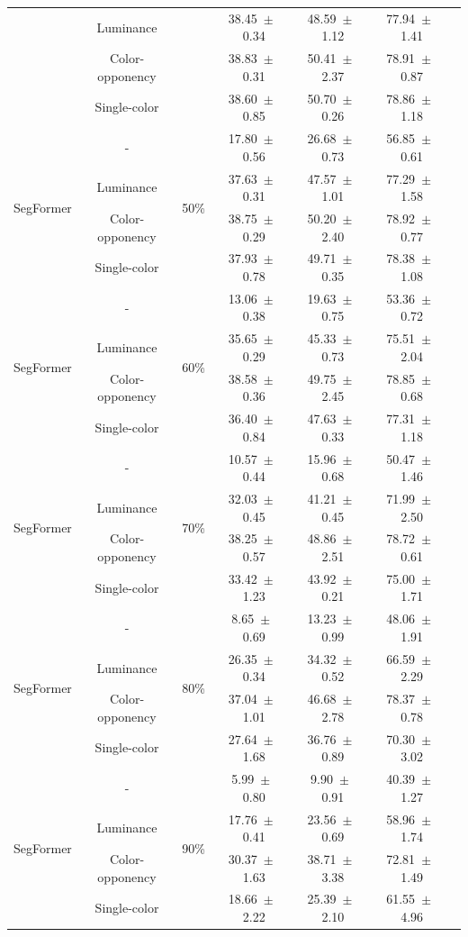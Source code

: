 \begin{table}[h]
\begin{tabular}{@{}lccc ccc@{}}
& Luminance & & 38.45~$\pm$~0.34 & 48.59~$\pm$~1.12 & 77.94~$\pm$~1.41 \\
& Color-opponency & & 38.83~$\pm$~0.31 & 50.41~$\pm$~2.37 & 78.91~$\pm$~0.87 \\
& Single-color & & 38.60~$\pm$~0.85 & 50.70~$\pm$~0.26 & 78.86~$\pm$~1.18 \\
\midrule
\multirow{4}{*}{SegFormer} & - & \multirow{4}{*}{50\%} & 17.80~$\pm$~0.56 & 26.68~$\pm$~0.73 & 56.85~$\pm$~0.61 \\
& Luminance & & 37.63~$\pm$~0.31 & 47.57~$\pm$~1.01 & 77.29~$\pm$~1.58 \\
& Color-opponency & & 38.75~$\pm$~0.29 & 50.20~$\pm$~2.40 & 78.92~$\pm$~0.77 \\
& Single-color & & 37.93~$\pm$~0.78 & 49.71~$\pm$~0.35 & 78.38~$\pm$~1.08 \\
\midrule
\multirow{4}{*}{SegFormer} & - & \multirow{4}{*}{60\%} & 13.06~$\pm$~0.38 & 19.63~$\pm$~0.75 & 53.36~$\pm$~0.72 \\
& Luminance & & 35.65~$\pm$~0.29 & 45.33~$\pm$~0.73 & 75.51~$\pm$~2.04 \\
& Color-opponency & & 38.58~$\pm$~0.36 & 49.75~$\pm$~2.45 & 78.85~$\pm$~0.68 \\
& Single-color & & 36.40~$\pm$~0.84 & 47.63~$\pm$~0.33 & 77.31~$\pm$~1.18 \\
\midrule
\multirow{4}{*}{SegFormer} & - & \multirow{4}{*}{70\%} & 10.57~$\pm$~0.44 & 15.96~$\pm$~0.68 & 50.47~$\pm$~1.46 \\
& Luminance & & 32.03~$\pm$~0.45 & 41.21~$\pm$~0.45 & 71.99~$\pm$~2.50 \\
& Color-opponency & & 38.25~$\pm$~0.57 & 48.86~$\pm$~2.51 & 78.72~$\pm$~0.61 \\
& Single-color & & 33.42~$\pm$~1.23 & 43.92~$\pm$~0.21 & 75.00~$\pm$~1.71 \\
\midrule
\multirow{4}{*}{SegFormer} & - & \multirow{4}{*}{80\%} & 8.65~$\pm$~0.69 & 13.23~$\pm$~0.99 & 48.06~$\pm$~1.91 \\
& Luminance & & 26.35~$\pm$~0.34 & 34.32~$\pm$~0.52 & 66.59~$\pm$~2.29 \\
& Color-opponency & & 37.04~$\pm$~1.01 & 46.68~$\pm$~2.78 & 78.37~$\pm$~0.78 \\
& Single-color & & 27.64~$\pm$~1.68 & 36.76~$\pm$~0.89 & 70.30~$\pm$~3.02 \\
\midrule
\multirow{4}{*}{SegFormer} & - & \multirow{4}{*}{90\%} & 5.99~$\pm$~0.80 & 9.90~$\pm$~0.91 & 40.39~$\pm$~1.27 \\
& Luminance & & 17.76~$\pm$~0.41 & 23.56~$\pm$~0.69 & 58.96~$\pm$~1.74 \\
& Color-opponency & & 30.37~$\pm$~1.63 & 38.71~$\pm$~3.38 & 72.81~$\pm$~1.49 \\
& Single-color & & 18.66~$\pm$~2.22 & 25.39~$\pm$~2.10 & 61.55~$\pm$~4.96 \\
\midrule
\bottomrule
\end{tabular}
\label{tab:sparse_results_segformer_acdc_full}
\end{table}